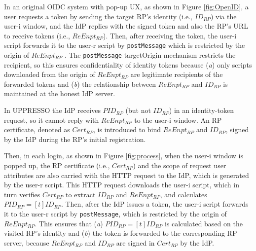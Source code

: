 In an original OIDC system with pop-up UX, as shown in Figure \ref{fig:OpenID},
    a user requests a token by sending the target RP's identity (i.e., $ID_{RP}$) via the user-i window,
    and the IdP replies with the signed token and also the RP's URL to receive tokens (i.e., $ReEnpt_{RP}$).
Then, after receiving the token, the user-i script forwards it to the user-r script by \verb+postMessage+
    which is restricted by the origin of $ReEnpt_{RP}$ \cite{SPRESSO,MITREid,BrowserID,GoogleIdIntegrate,de2014oauth,OpenIDConnect}.
The \verb+postMessage+ targetOrigin mechanism \cite{postm-targeto} restricts the recipient,
so this ensures confidentiality of identity tokens because (\emph{a}) only scripts downloaded from the origin of $ReEnpt_{RP}$ are legitimate recipients of the forwarded tokens
    and (\emph{b}) the relationship between $ReEnpt_{RP}$ and $ID_{RP}$ is maintained at the honest IdP server.

In UPPRESSO the IdP receives $PID_{RP}$ (but not $ID_{RP}$) in an identity-token request,
    so it cannot reply with $ReEnpt_{RP}$ to the user-i window.
An RP certificate, denoted as $Cert_{RP}$, is introduced to bind $ReEnpt_{RP}$ and $ID_{RP}$, signed by the IdP during the RP's initial registration.
%
%

Then, in each login, 
as shown in Figure \ref{fig:process},
when the user-i window is popped up,
    the RP certificate (i.e., $Cert_{RP}$) and the scope of request user attributes are also carried with the HTTP request to the IdP,
    which is generated by the user-r script.
This HTTP request downloads the user-i script,
    which in turn verifies $Cert_{RP}$ to extract $ID_{RP}$ and $ReEnpt_{RP}$, and calculates $PID_{RP} = [t]ID_{RP}$. %
Then, after the IdP issues a token,
    the user-i script forwards it to the user-r script by \verb+postMessage+,
    which is restricted by the origin of $ReEnpt_{RP}$.
This ensures that (\emph{a}) $PID_{RP} = [t]{ID_{RP}}$ is calculated based on the visited RP's identity and (\emph{b}) the token is forwarded to the corresponding RP server,
    because $ReEnpt_{RP}$ and $ID_{RP}$ are signed in $Cert_{RP}$ by the IdP.

